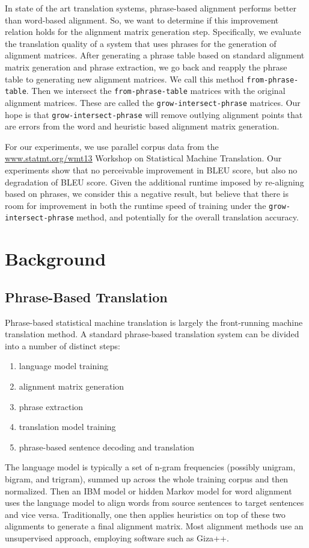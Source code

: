 \documentclass[twocolumn]{article}
\newcommand{\linespacing}{
  \onehalfspacing
}
\newcommand{\phraseAlign}{\texttt{from-phrase-table}}
\newcommand{\phraseIntersectAlign}{\texttt{grow-intersect-phrase}}
\newcommand{\wrapSingleSpacing}[1]{
  \singlespacing
  #1
  \linespacing{}
}
\begin{document}
In state of the art translation systems, phrase-based alignment performs better
than word-based alignment. So, we want to determine if this improvement relation
holds for the alignment matrix generation step. Specifically, we evaluate the
translation quality of a system that uses phrases for the generation of
alignment matrices. After generating a phrase table based on standard alignment
matrix generation and phrase extraction, we go back and reapply the phrase table
to generating new alignment matrices. We call this method \phraseAlign{}.
Then we intersect the \phraseAlign{} matrices with the original alignment
matrices. These are called the \phraseIntersectAlign{} matrices.
Our hope is that \phraseIntersectAlign{} will remove outlying alignment points
that are errors from the word and heuristic based alignment matrix generation.

For our experiments, we use parallel corpus data from the
\href{http://www.statmt.org/wmt13/training-parallel-nc-v8.tgz}
     {\underline{www.statmt.org/wmt13}}
Workshop on Statistical Machine Translation.
Our experiments show that no perceivable improvement in BLEU score, but also no
degradation of BLEU score. Given the additional runtime imposed by re-aligning
based on phrases, we consider this a negative result, but believe that there is
room for improvement in both the runtime speed of training under the
\phraseIntersectAlign{} method, and potentially for the overall translation
accuracy.


\section{Background}
\subsection{Phrase-Based Translation}
Phrase-based statistical machine translation is largely the front-running
machine translation method. A standard phrase-based translation system can be
divided into a number of distinct steps:
\wrapSingleSpacing{
\begin{enumerate}
    \item language model training
    \item alignment matrix generation
    \item phrase extraction
    \item translation model training
    \item phrase-based sentence decoding and translation
\end{enumerate}
}
The language model is typically a set of n-gram frequencies (possibly unigram,
bigram, and trigram), summed up across the whole training corpus and then
normalized. Then an IBM model or hidden Markov model for word alignment uses the
language model to align words from source sentences to target sentences and vice
versa. Traditionally, one then applies heuristics on top of these two alignments
to generate a final alignment matrix.
Most alignment methods use an unsupervised approach, employing software such as
Giza++.
\end{document}
